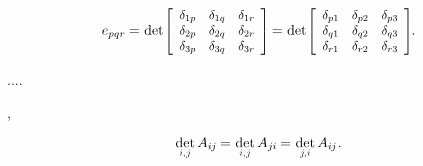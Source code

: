 \nopagebreak\vspace{-0.1em}
\begin{equation}\label{permutationsymbolasdeterminant}
e_{pqr} \hspace{-0.1ex}
= \hspace{.1ex}
\determinant\hspace{-0.25ex} \scalebox{.92}{$\left[ \begin{array}{ccc}
\delta_{1p} & \delta_{1q} & \delta_{1r} \\
\delta_{2p} & \delta_{2q} & \delta_{2r} \\
\delta_{3p} & \delta_{3q} & \delta_{3r}
\end{array} \hspace{-0.1ex} \right]$} \hspace{-0.2ex}
= \hspace{.1ex}
\determinant\hspace{-0.25ex} \scalebox{.92}{$\left[ \begin{array}{ccc}
\delta_{p1} & \delta_{p2} & \delta_{p3} \\
\delta_{q1} & \delta_{q2} & \delta_{q3} \\
\delta_{r1} & \delta_{r2} & \delta_{r3}
\end{array} \hspace{-0.1ex} \right]$}
\hspace{-0.2ex} .
\end{equation}

....

,

\nopagebreak\vspace{-0.25em}
\begin{equation*}
\determinantby{i}{\hspace{.15ex}j} \, A_{i\hspace{-0.1ex}j} \hspace{-0.16ex}
= \hspace{.1ex} \determinantby{i}{\hspace{.15ex}j} \, A_{j\hspace{-0.06ex}i} \hspace{-0.16ex}
= \hspace{.1ex} \determinantby{j\hspace{-0.2ex}}{\hspace{.1ex}i} \, A_{i\hspace{-0.1ex}j}
\hspace{.1ex} .
\end{equation*}

